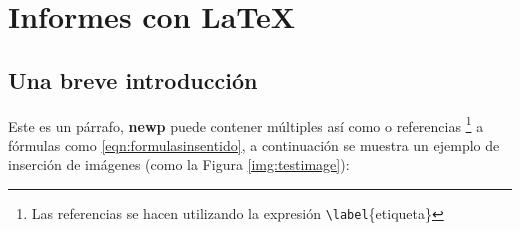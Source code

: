%
%


\section{Informes con \LaTeX}

	\subsection{Una breve introducción}
	
		\lipsum[4]
		
		
		Este es un párrafo, \textbf{newp} puede contener múltiples  así como  o referencias \footnote{ Las referencias se hacen utilizando la expresión \texttt{\textbackslash label}\{etiqueta\}} a fórmulas como \eqref{eqn:formulasinsentido}, a continuación se muestra un ejemplo de inserción de imágenes (como la Figura \ref{img:testimage}):
		
